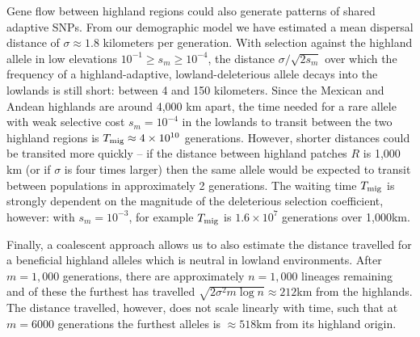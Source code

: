 Gene flow between highland regions could also generate patterns of shared adaptive SNPs.
From our demographic model we have estimated a mean dispersal distance of $\sigma \approx 1.8$ kilometers per generation.
With selection against the highland allele in low elevations $10^{-1} \ge s_m \ge 10^{-4}$, the distance $\sigma/\sqrt{2s_m}$ over which the frequency of a highland-adaptive, lowland-deleterious allele decays into the lowlands is still short: between 4 and 150 kilometers.
Since the Mexican and Andean highlands are around 4,000 km apart, the time needed for a rare allele with weak selective cost $s_m=10^{-4}$ in the lowlands to transit between the two highland regions is $T_{\text{mig}} \approx 4 \times 10^{10}$ generations. 
However, shorter distances could be transited more quickly -- if the distance between highland patches $R$ is 1,000 km (or if $\sigma$ is four times larger) then the same allele would be expected to transit between populations in approximately 2 generations.
The waiting time $T_{\text{mig}}$ is  strongly dependent on the magnitude of the deleterious selection coefficient, however: with $s_m=10^{-3}$, for example $T_{\text{mig}}$ is $1.6 \times 10^7$ generations over 1,000km.

Finally, a coalescent approach allows us to also estimate the distance travelled for a beneficial highland alleles which is neutral in lowland environments.  After $m=1,000$ generations, there are approximately $n=1,000$ lineages remaining and of these the furthest has travelled  $\sqrt{2 \sigma^2 m \log n} \approx 212$km from the highlands.  The distance travelled, however, does not scale linearly with time, such that at  $m=6000$ generations the furthest alleles is $\approx 518$km from its highland origin. 

